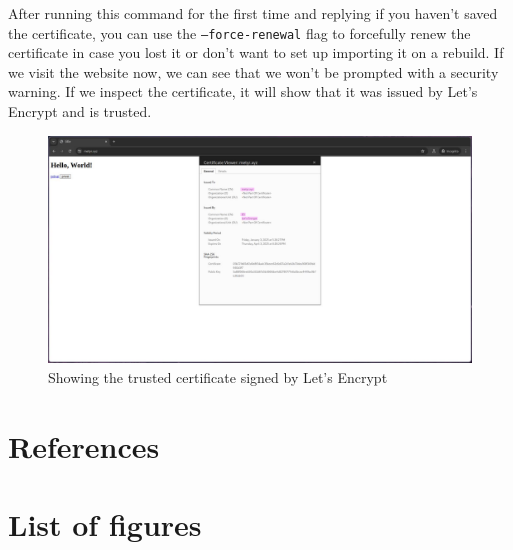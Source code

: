 \documentclass[a4paper]{article}
\newcommand{\abc}{\hfill \break}
\begin{document}
After running this command for the first time and replying if you haven't saved the certificate, you can use the \texttt{--force-renewal} flag to forcefully renew the certificate in case you lost it or don't want to set up importing it on a rebuild.\cite{cerbot-force-newnew} \abc
If we visit the website now, we can see that we won't be prompted with a security warning. If we inspect the certificate, it will show that it was issued by Let's Encrypt and is trusted.
\begin{figure}[!htbp]
	\includegraphics[scale=0.2]{images/nobs.png}
	\centering
	\caption{Showing the trusted certificate signed by Let's Encrypt}
\end{figure}\abc
\newpage
\section{References}

\newpage
\section{List of figures}

\listoffigures
\end{document}
